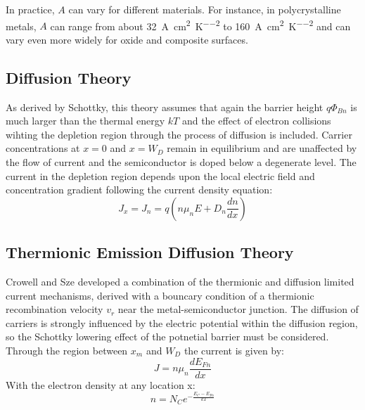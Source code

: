 In practice, \( A \) can vary for different materials. For instance, in polycrystalline metals, \( A \) can range from about \SI{32}{\ampere\per\centi\meter\squared\per\kelvin\squared} to \SI{160}{\ampere\per\centi\meter\squared\per\kelvin\squared} and can vary even more widely for oxide and composite surfaces.

\subsection{Diffusion Theory}
As derived by Schottky, this theory assumes that again the barrier height $q\Phi_{Bn}$ is much larger than the thermal energy $kT$ and the effect of electron collisions wihting the depletion region through the process of diffusion is included. Carrier concentrations at $x=0$ and $x=W_{D}$ remain in equilibrium and are unaffected by the flow of current and the semiconductor is doped below a degenerate level. The current in the depletion region depends upon the local electric field and concentration gradient following the current density equation:
\begin{equation}
	J_{x} = J_{n} = q\left(n\mu_{n}E+D_{n}\frac{dn}{dx}\right)
\end{equation}

\subsection{Thermionic Emission Diffusion Theory}
Crowell and Sze developed a combination of the thermionic and diffusion limited current mechanisms, derived with a bouncary condition of a thermionic recombination velocity $v_{r}$ near the metal-semiconductor junction. The diffusion of carriers is strongly influenced by the electric potential within the diffusion region, so the Schottky lowering effect of the potnetial barrier must be considered. Through the region between $x_{m}$ and $W_{D}$ the current is given by:
\begin{equation}
	J=n\mu_{n}\frac{dE_{Fn}}{dx}
\end{equation}
With the electron density at any location x:
\begin{equation}
	n=N_{C}e^{-\frac{E_{C}-E_{Fn}}{kT}}
\end{equation}

